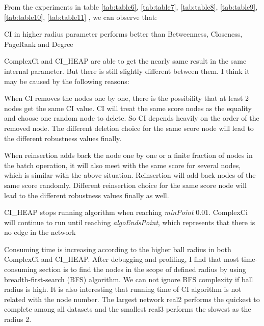 \documentclass{article}
\begin{document}
	
	From the experiments in table \ref{tab:table6}, \ref{tab:table7}, \ref{tab:table8}, \ref{tab:table9}, \ref{tab:table10}, \ref{tab:table11} , we can observe that:
	
	\begin{enumerate}
		
		
	\begin{item}
		CI in higher radius parameter performs better than Betweenness, Closeness, PageRank and Degree
	\end{item}		
		
		\begin{item}
			ComplexCi and CI\_HEAP are able to get the nearly same result in the same internal parameter. But there is still slightly different between them. I think it may be caused by the following reasons:
			
			\begin{enumerate}
				\begin{item}
					When CI removes the nodes one by one, there is the possibility that at least 2 nodes get the same CI value. CI will treat the same score nodes as the equality and choose one random node to delete. So CI depends heavily on the order of the removed node. The different deletion choice for the same score node will lead to the different robustness values finally. 
				\end{item}
				\begin{item}
					When reinsertion adds back the node one by one or a finite fraction of nodes in the batch operation, it will also meet with the same score for several nodes, which is similar with the above situation. Reinsertion will add back nodes of the same score randomly. Different reinsertion choice for the same score node will lead to the different robustness values finally as well.
				\end{item}		
				\begin{item}
					CI\_HEAP stops running algorithm when reaching \textit{minPoint} 0.01. ComplexCi will continue to run until reaching \textit{algoEndsPoint}, which represents that there is no edge in the network
				\end{item}			
				
			\end{enumerate}			
			
			
		\end{item}			
		
		\begin{item}
			Consuming time is increasing according to the higher ball radius in both ComplexCi and CI\_HEAP. After debugging and profiling, I find that most time-consuming section is to find the nodes in the scope of defined radius by using breadth-first-search (BFS) algorithm. We can not ignore BFS complexity if ball radius is high. It is also interesting that running time of CI algorithm is not related with the node number. The largest network real2 performs the quickest to complete among all datasets and the smallest real3 performs the slowest as the radius 2.
		\end{item}


\end{enumerate}
\end{document}
